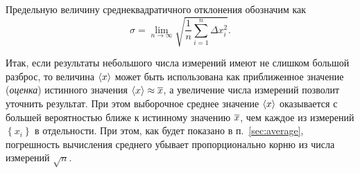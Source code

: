 Предельную величину среднеквадратичного отклонения обозначим как
\[
\sigma = \lim\limits _{n\to\infty}\sqrt{\frac{1}{n}\sum\limits _{i=1}^{n}\Delta x_{i}^{2}}.
\]


Итак, если результаты небольшого числа
измерений имеют не слишком большой разброс, то величина $\left<x\right>$
может быть использована как приближенное значение (\emph{оценка}) истинного значения
$\left<x\right>\approx \overline{x}$,
а увеличение числа измерений позволит уточнить результат. 
При этом выборочное среднее значение $\left<x\right>$ оказывается с большей
вероятностью ближе к истинному значению $\overline{x}$, чем каждое из измерений
 $\left\{x_i\right\}$ в отдельности. При этом, как будет показано в
 п.~\ref{sec:average}, погрешность вычисления среднего убывает пропорционально корню из числа измерений $\sqrt{n}$.



%

